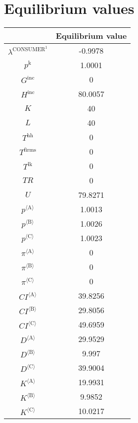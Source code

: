 

\section{Equilibrium values}


\begin{tabular}{c|c|}
  & Equilibrium value\\
\hline
$\lambda^{\mathrm{CONSUMER}^{\mathrm{1}}}$ & -0.9978 \\
$p^{\mathrm{k}}$ & 1.0001 \\
$G^{\mathrm{inc}}$ & 0 \\
$H^{\mathrm{inc}}$ & 80.0057 \\
$K$ & 40 \\
$L$ & 40 \\
$T^{\mathrm{hh}}$ & 0 \\
$T^{\mathrm{firms}}$ & 0 \\
$T^{\mathrm{lk}}$ & 0 \\
${T\!R}$ & 0 \\
$U$ & 79.8271 \\
${p}^{\langle \mathrm{A}\rangle}$ & 1.0013 \\
${p}^{\langle \mathrm{B}\rangle}$ & 1.0026 \\
${p}^{\langle \mathrm{C}\rangle}$ & 1.0023 \\
${\pi}^{\langle \mathrm{A}\rangle}$ & 0 \\
${\pi}^{\langle \mathrm{B}\rangle}$ & 0 \\
${\pi}^{\langle \mathrm{C}\rangle}$ & 0 \\
${{C\!I}}^{\langle \mathrm{A}\rangle}$ & 39.8256 \\
${{C\!I}}^{\langle \mathrm{B}\rangle}$ & 29.8056 \\
${{C\!I}}^{\langle \mathrm{C}\rangle}$ & 49.6959 \\
${D}^{\langle \mathrm{A}\rangle}$ & 29.9529 \\
${D}^{\langle \mathrm{B}\rangle}$ & 9.997 \\
${D}^{\langle \mathrm{C}\rangle}$ & 39.9004 \\
${K}^{\langle \mathrm{A}\rangle}$ & 19.9931 \\
${K}^{\langle \mathrm{B}\rangle}$ & 9.9852 \\
${K}^{\langle \mathrm{C}\rangle}$ & 10.0217 \\

\end{tabular}
